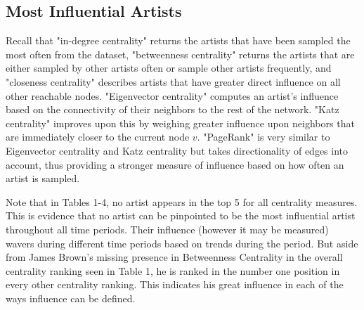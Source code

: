 \documentclass[pageno]{jpaper}
\begin{document}
\subsection{Most Influential Artists}
Recall that "in-degree centrality" returns the artists that have been sampled the most often from the dataset, "betweenness centrality" returns the artists that are either sampled by other artists often or sample other artists frequently, and "closeness centrality" describes artists that have greater direct influence on all other reachable nodes. "Eigenvector centrality" computes an artist's influence based on the connectivity of their neighbors to the rest of the network. "Katz centrality" improves upon this by weighing greater influence upon neighbors that are immediately closer to the current node $v$. "PageRank" is very similar to Eigenvector centrality and Katz centrality but takes directionality of edges into account, thus providing a stronger measure of influence based on how often an artist is sampled.
\begin{table}[H]
\caption{Top Artists by Centralities (All Time Periods)}
\label{table:table1}
\end{table}
Note that in Tables 1-4, no artist appears in the top 5 for all centrality measures. This is evidence that no artist can be pinpointed to be the most influential artist throughout all time periods. Their influence (however it may be measured) wavers during different time periods based on trends during the period. But aside from James Brown's missing presence in Betweenness Centrality in the overall centrality ranking seen in Table 1, he is ranked in the number one position in every other centrality ranking. This indicates his great influence in each of the ways influence can be defined. 
\end{document}
